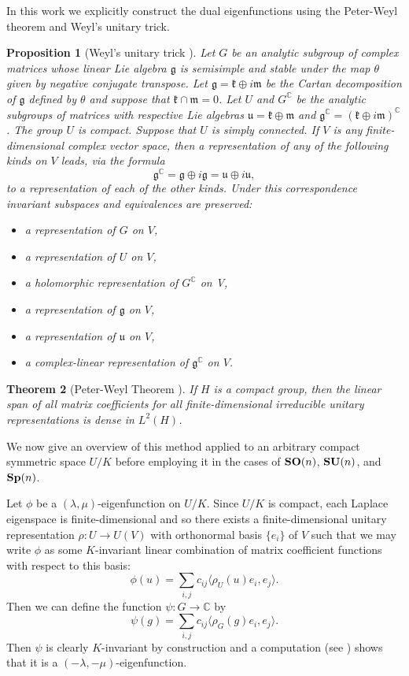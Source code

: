 \documentclass[11pt,reqno]{amsart}
\theoremstyle{plain}
\newtheorem{theorem}                 {Theorem}[section]
\newtheorem{proposition}  [theorem]  {Proposition}
\theoremstyle{definition}
\numberwithin{equation}{section}
\def \cn{{\mathbb C}}
\def \g{\mathfrak{g}}
\def \k{\mathfrak{k}}
\def \m{\mathfrak{m}}
\def \SO#1{\text{\bf SO}(#1)}
\def \SU#1{\text{\bf SU}(#1)}
\def \Sp#1{\text{\bf Sp}(#1)}
\numberwithin{equation}{section}
\begin{document}
In this work we explicitly construct the dual eigenfunctions using the Peter-Weyl theorem and Weyl's unitary trick.

\begin{proposition}[Weyl's unitary trick \cite{Knapp-Book}]
	Let $G$ be an analytic subgroup of complex matrices whose linear Lie algebra $\g$ is semisimple and stable under the map $\theta$ given by negative conjugate transpose. Let $\g = \k \oplus i\m$ be the Cartan decomposition of $\g$ defined by $\theta$ and suppose that $\k \cap \m = 0$. Let $U$ and $G^\cn$ be the analytic subgroups of matrices with respective Lie algebras $\mathfrak{u} = \k \oplus \m$ and $\g^\cn = (\k \oplus i \m)^\cn$. The group $U$ is compact. Suppose that $U$ is simply connected. If $V$ is any finite-dimensional complex vector space, then a representation of any of the following kinds on $V$ leads, via the formula
	$$ \g^\cn = \g \oplus i \g = \mathfrak{u} \oplus i \mathfrak{u},$$
	to a representation of each of the other kinds. Under this correspondence invariant subspaces and equivalences are preserved:
	\begin{itemize}
		\item a representation of $G$ on $V$,
		\item a representation of $U$ on $V$,
		\item a holomorphic representation of $G^\cn$ on V,
		\item a representation of $\g$ on $V$,
		\item a representation of $\mathfrak{u}$ on $V$,
		\item a complex-linear representation of $\g^\cn$ on $V$.
	\end{itemize}
\end{proposition}

\begin{theorem}[Peter-Weyl Theorem \cite{Knapp-Book}]
	If $H$ is a compact group, then the linear span of all matrix coefficients for all finite-dimensional irreducible unitary representations is dense in $L^2(H)$.
\end{theorem}

We now give an overview of this method applied to an arbitrary compact symmetric space $U/K$ before employing it in the cases of $\SO n$, $\SU n$, and $\Sp n$.

Let $\phi$ be a $(\lambda,\mu)$-eigenfunction on $U/K$. 
Since $U/K$ is compact, each Laplace eigenspace is finite-dimensional and so there exists a finite-dimensional unitary representation $\rho:U \to U(V)$ with orthonormal basis $\{e_i\}$ of $V$ such that we may write $\phi$ as some $K$-invariant linear combination of matrix coefficient functions with respect to this basis:
$$ \phi(u) =\sum_{i,j} c_{ij} \langle \rho_U(u) e_i, e_j \rangle .$$ 
Then we can define the function $\psi: G \to \cn$ by
$$ \psi(g) =\sum_{i,j} c_{ij} \langle \rho_G(g) e_i, e_j \rangle .$$
Then $\psi$ is clearly $K$-invariant by construction and a computation (see
\cite{Gud-Sve-1}) shows that it is a $(-\lambda,-\mu)$-eigenfunction.
\end{document}
